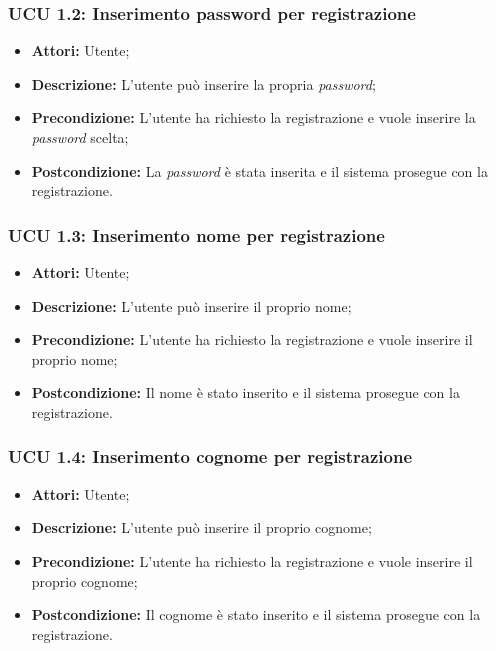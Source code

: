 \hypertarget{U1.2}{}
\subsubsection{UCU 1.2: Inserimento password per registrazione}
\begin{itemize}
	\item \textbf{Attori:} Utente;
	\item \textbf{Descrizione:} L'utente può inserire la propria \textit{password};
	\item \textbf{Precondizione:} L'utente ha richiesto la registrazione e vuole inserire la \textit{password} scelta;
	\item \textbf{Postcondizione:} La \textit{password} è stata inserita e il sistema prosegue con la registrazione.
\end{itemize}

\hypertarget{U1.3}{}
\subsubsection{UCU 1.3: Inserimento nome per registrazione}
\begin{itemize}
	\item \textbf{Attori:} Utente;
	\item \textbf{Descrizione:} L'utente può inserire il proprio nome;
	\item \textbf{Precondizione:} L'utente ha richiesto la registrazione e vuole inserire il proprio nome;
	\item \textbf{Postcondizione:} Il nome è stato inserito e il sistema prosegue con la registrazione.
\end{itemize}

\hypertarget{U1.4}{}
\subsubsection{UCU 1.4: Inserimento cognome per registrazione}
\begin{itemize}
	\item \textbf{Attori:} Utente;
	\item \textbf{Descrizione:} L'utente può inserire il proprio cognome;
	\item \textbf{Precondizione:} L'utente ha richiesto la registrazione e vuole inserire il proprio cognome;
	\item \textbf{Postcondizione:} Il cognome è stato inserito e il sistema prosegue con la registrazione.
\end{itemize}

